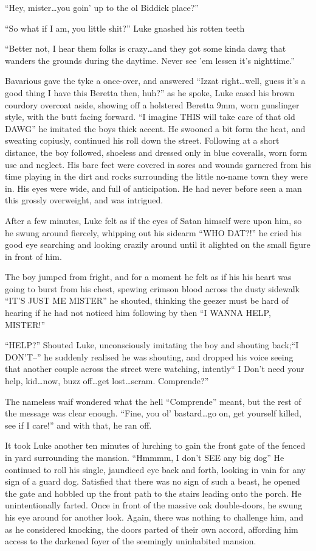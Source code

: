 ``Hey, mister{\ldots}you goin' up to the ol Biddick place?''

``So what if I am, you little shit?'' Luke gnashed his rotten
teeth

``Better not, I hear them folks is crazy{\ldots}and they got some kinda
dawg that wanders the grounds during the daytime. Never see 'em
lessen it's nighttime.''

Bavarious gave the tyke a once-over, and answered ``Izzat
right{\ldots}well, guess it's a good thing I have this Beretta then,
huh?'' as he spoke, Luke eased his brown courdory overcoat aside,
showing off a holstered Beretta 9mm, worn gunslinger style, with
the butt facing forward. ``I imagine THIS will take care of that old
DAWG'' he imitated the boys thick accent. He swooned a bit form the
heat, and sweating copiusly, continued his roll down the street.
Following at a short distance, the boy followed, shoeless and
dressed only in blue coveralls, worn form use and neglect. His bare
feet were covered in sores and wounds garnered from his time
playing in the dirt and rocks surrounding the little no-name town
they were in. His eyes were wide, and full of anticipation. He had
never before seen a man this grossly overweight, and was
intrigued.

After a few minutes, Luke felt as if the eyes of Satan himself were
upon him, so he swung around fiercely, whipping out his sidearm
``WHO DAT?!'' he cried his good eye searching and looking crazily
around until it alighted on the small figure in front of him.

The boy jumped from fright, and for a moment he felt as if his his
heart was going to burst from his chest, spewing crimson blood
across the dusty sidewalk ``IT'S JUST ME MISTER'' he shouted,
thinking the geezer must be hard of hearing if he had not noticed
him following by then ``I WANNA HELP, MISTER!''

``HELP?'' Shouted Luke, unconsciously imitating the boy and shouting
back;``I DON'T--'' he suddenly realised he was shouting, and dropped
his voice seeing that another couple across the street were
watching, intently`` I Don't need your help, kid{\ldots}now, buzz
off{\ldots}get lost{\ldots}scram. Comprende?''

The nameless waif wondered what the hell ``Comprende'' meant, but the
rest of the message was clear enough. ``Fine, you ol' bastard{\ldots}go
on, get yourself killed, see if I care!'' and with that, he ran
off.

It took Luke another ten minutes of lurching to gain the front gate
of the fenced in yard surrounding the mansion. ``Hmmmm, I don't SEE
any big dog'' He continued to roll his single, jaundiced eye back
and forth, looking in vain for any sign of a guard dog. Satisfied
that there was no sign of such a beast, he opened the gate and
hobbled up the front path to the stairs leading onto the porch. He
unintentionally farted. Once in front of the massive oak
double-doors, he swung his eye around for another look. Again,
there was nothing to challenge him, and as he considered knocking,
the doors parted of their own accord, affording him access to the
darkened foyer of the seemingly uninhabited mansion.

